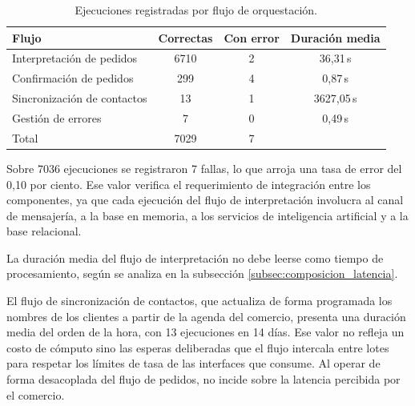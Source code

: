 \begin{table}[H]
    \centering
    \caption{Ejecuciones registradas por flujo de orquestación.}
    \label{tab:flujos}
    \begin{tabular}{L{5.6cm} c c c}
        \toprule
        \textbf{Flujo}              & \textbf{Correctas} & \textbf{Con error} & \textbf{Duración media} \\
        \midrule
        Interpretación de pedidos   & 6710               & 2                  & 36,31\,s                \\
        Confirmación de pedidos     & 299                & 4                  & 0,87\,s                 \\
        Sincronización de contactos & 13                 & 1                  & 3627,05\,s              \\
        Gestión de errores          & 7                  & 0                  & 0,49\,s                 \\
        \midrule
        Total                       & 7029               & 7                  &                         \\
        \bottomrule
    \end{tabular}
\end{table}

Sobre 7036 ejecuciones se registraron 7 fallas, lo que arroja una tasa de error del 0,10 por ciento. Ese valor verifica el requerimiento de integración entre los componentes, ya que cada ejecución del flujo de interpretación involucra al canal de mensajería, a la base en memoria, a los servicios de inteligencia artificial y a la base relacional.

La duración media del flujo de interpretación no debe leerse como tiempo de procesamiento, según se analiza en la subsección \ref{subsec:composicion_latencia}.

El flujo de sincronización de contactos, que actualiza de forma programada los nombres de los clientes a partir de la agenda del comercio, presenta una duración media del orden de la hora, con 13 ejecuciones en 14 días. Ese valor no refleja un costo de cómputo sino las esperas deliberadas que el flujo intercala entre lotes para respetar los límites de tasa de las interfaces que consume. Al operar de forma desacoplada del flujo de pedidos, no incide sobre la latencia percibida por el comercio.


